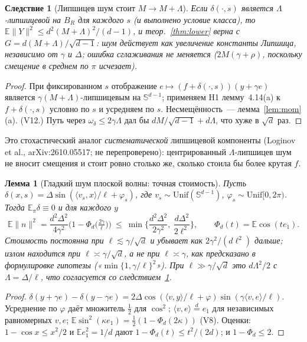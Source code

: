 \documentclass[11pt,a4paper]{article}
\numberwithin{equation}{section}
\newtheorem{lemma}[theorem]{Лемма}
\newtheorem{corollary}[theorem]{Следствие}
\theoremstyle{definition}
\theoremstyle{remark}
\newcommand{\E}{\mathbb E}\newcommand{\R}{\mathbb R}\newcommand{\Z}{\mathbb Z}\let\Prob\relax\newcommand{\Prob}{\mathbb P}
\newcommand{\norm}[1]{\lVert #1\rVert}\newcommand{\abs}[1]{\lvert #1\rvert}\newcommand{\ip}[2]{\langle #1,#2\rangle}
\newcommand{\Unif}{\mathrm{Unif}}\newcommand{\TV}{\mathrm{TV}}\newcommand{\BC}{\mathrm{BC}}\newcommand{\tmix}{t_{\rm mix}}
\newcommand{\Sph}{\mathbb S^{d-1}}\newcommand{\Ball}{\mathbb B}\newcommand{\iid}{\mathrm{iid}}
\begin{document}
\begin{corollary}[Липшицев шум стоит $M\to M+\Lambda$]\label{cor:lip}
Если $\delta(\cdot,s)$ является $\Lambda$-липшицевой на $B_R$ для каждого $s$ (и выполнено условие класса), то $\E\norm Y^2\le d^2(M+\Lambda)^2/(d-1)$, и теор.~\ref{thm:lower} верна с $G=d(M+\Lambda)/\sqrt{d-1}$: шум действует как увеличение константы Липшица, независимо от $\gamma$ и $\Delta$; ошибка сглаживания не меняется ($2M(\gamma+\rho)$, поскольку смещение в среднем по $\pi$ исчезает).
\end{corollary}
\begin{proof}
При фиксированном $s$ отображение $e\mapsto(f+\delta(\cdot,s))(y+\gamma e)$ является $\gamma(M+\Lambda)$-липшицевым на $\Sph$; применяем H1 лемму~4.14(a) к $f+\delta(\cdot,s)$ условно по $s$ и усредняем по $s$. Несмещённость~--- лемма~\ref{lem:mom}(a). (V12.) Путь через $\omega_\delta\le2\gamma\Lambda$ дал бы $dM/\sqrt{d-1}+d\Lambda$, что хуже в $\sqrt d$ раз.
\end{proof}
\begin{sloppypar}\noindent Это стохастический аналог \emph{систематической} липшицевой компоненты (Loginov et al., arXiv:2610.05517;
не перепроверено): центрированный $\Lambda$-липшицев шум не вносит смещения и стоит ровно столько же, сколько стоила бы более крутая $f$.\end{sloppypar}

\begin{lemma}[Гладкий шум плоской волны: точная стоимость]\label{lem:sin}
Пусть $\delta(x,s)=\Delta\sin(\ip{v_s}x/\ell+\varphi_s)$, где $v_s\sim\Unif(\Sph)$, $\varphi_s\sim\Unif[0,2\pi)$. Тогда $\E_\pi\delta\equiv0$ и для каждого $y$
\[
\E\norm n^2=\frac{d^2\Delta^2}{4\gamma^2}\Big(1-\Phi_d\big(\tfrac{2\gamma}\ell\big)\Big)\ \le\ \min\Big\{\frac{d^2\Delta^2}{2\gamma^2},\ \frac{d\Delta^2}{2\ell^2}\Big\},\qquad \Phi_d(t)=\E\cos(te_1).
\]
Стоимость постоянна при $\ell\lesssim\gamma/\sqrt d$ и убывает как $2\gamma^2/(d\ell^2)$ дальше; излом находится при $\ell\asymp\gamma/\sqrt d$, а не при $\ell\asymp\gamma$, как предсказано в формулировке гипотезы («$\min\{1,\gamma/\ell\}^2$»). При $\ell\gg\gamma/\sqrt d$ это $d\Lambda^2/2$ с $\Lambda=\Delta/\ell$, что согласуется со следствием~\ref{cor:lip}.
\end{lemma}
\begin{proof}
$\delta(y+\gamma e)-\delta(y-\gamma e)=2\Delta\cos(\ip vy/\ell+\varphi)\sin(\gamma\ip ve/\ell)$. Усреднение по $\varphi$ даёт множитель $\frac12$ для $\cos^2$; $\ip ve\overset{d}=e_1$ для независимых равномерных $v,e$; $\E\sin^2(\kappa e_1)=\frac12(1-\Phi_d(2\kappa))$ (V8). Оценки: $1-\cos x\le x^2/2$ и $\E e_1^2=1/d$ дают $1-\Phi_d(t)\le t^2/(2d)$; и $1-\Phi_d\le2$.
\end{proof}
\end{document}
